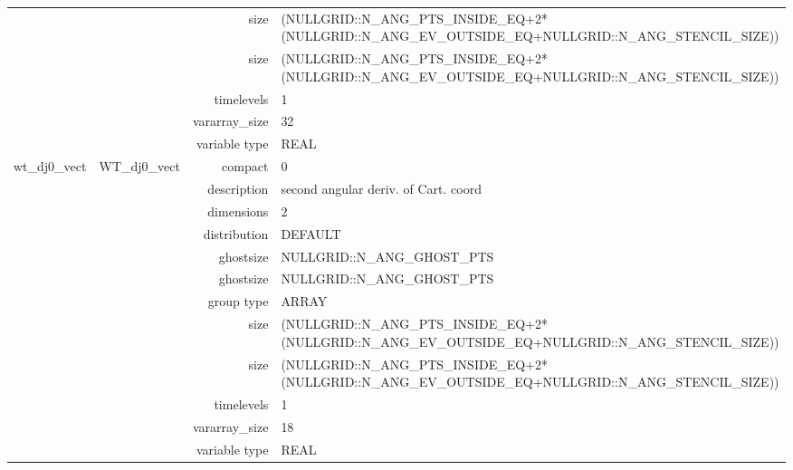 \begin{tabular*}{150mm}{|c|c@{\extracolsep{\fill}}|rl|}
 &  & size & (NULLGRID::N\_ANG\_PTS\_INSIDE\_EQ+2*(NULLGRID::N\_ANG\_EV\_OUTSIDE\_EQ+NULLGRID::N\_ANG\_STENCIL\_SIZE)) \\ 
& ~ & size & (NULLGRID::N\_ANG\_PTS\_INSIDE\_EQ+2*(NULLGRID::N\_ANG\_EV\_OUTSIDE\_EQ+NULLGRID::N\_ANG\_STENCIL\_SIZE)) \\ 
 &  & timelevels & 1 \\ 
 &  & vararray\_size & 32 \\ 
 &  & variable type & REAL \\ 
\hline 
wt\_dj0\_vect & WT\_dj0\_vect & compact & 0 \\ 
 &  & description & second angular deriv. of Cart. coord \\ 
 &  & dimensions & 2 \\ 
 &  & distribution & DEFAULT \\ 
 &  & ghostsize & NULLGRID::N\_ANG\_GHOST\_PTS \\ 
& ~ & ghostsize & NULLGRID::N\_ANG\_GHOST\_PTS \\ 
 &  & group type & ARRAY \\ 
 &  & size & (NULLGRID::N\_ANG\_PTS\_INSIDE\_EQ+2*(NULLGRID::N\_ANG\_EV\_OUTSIDE\_EQ+NULLGRID::N\_ANG\_STENCIL\_SIZE)) \\ 
& ~ & size & (NULLGRID::N\_ANG\_PTS\_INSIDE\_EQ+2*(NULLGRID::N\_ANG\_EV\_OUTSIDE\_EQ+NULLGRID::N\_ANG\_STENCIL\_SIZE)) \\ 
 &  & timelevels & 1 \\ 
 &  & vararray\_size & 18 \\ 
 &  & variable type & REAL \\ 
\hline 
\end{tabular*} 



\vspace{5mm}
\vspace{5mm}


